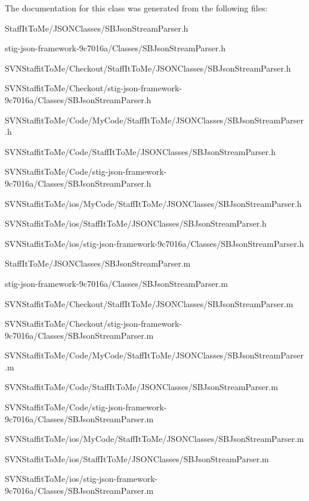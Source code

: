 \-The documentation for this class was generated from the following files\-:\begin{DoxyCompactItemize}
\item 
\-Staff\-It\-To\-Me/\-J\-S\-O\-N\-Classes/\-S\-B\-Json\-Stream\-Parser.\-h\item 
stig-\/json-\/framework-\/9c7016a/\-Classes/\-S\-B\-Json\-Stream\-Parser.\-h\item 
\-S\-V\-N\-Staffit\-To\-Me/\-Checkout/\-Staff\-It\-To\-Me/\-J\-S\-O\-N\-Classes/\-S\-B\-Json\-Stream\-Parser.\-h\item 
\-S\-V\-N\-Staffit\-To\-Me/\-Checkout/stig-\/json-\/framework-\/9c7016a/\-Classes/\-S\-B\-Json\-Stream\-Parser.\-h\item 
\-S\-V\-N\-Staffit\-To\-Me/\-Code/\-My\-Code/\-Staff\-It\-To\-Me/\-J\-S\-O\-N\-Classes/\-S\-B\-Json\-Stream\-Parser.\-h\item 
\-S\-V\-N\-Staffit\-To\-Me/\-Code/\-Staff\-It\-To\-Me/\-J\-S\-O\-N\-Classes/\-S\-B\-Json\-Stream\-Parser.\-h\item 
\-S\-V\-N\-Staffit\-To\-Me/\-Code/stig-\/json-\/framework-\/9c7016a/\-Classes/\-S\-B\-Json\-Stream\-Parser.\-h\item 
\-S\-V\-N\-Staffit\-To\-Me/ios/\-My\-Code/\-Staff\-It\-To\-Me/\-J\-S\-O\-N\-Classes/\-S\-B\-Json\-Stream\-Parser.\-h\item 
\-S\-V\-N\-Staffit\-To\-Me/ios/\-Staff\-It\-To\-Me/\-J\-S\-O\-N\-Classes/\-S\-B\-Json\-Stream\-Parser.\-h\item 
\-S\-V\-N\-Staffit\-To\-Me/ios/stig-\/json-\/framework-\/9c7016a/\-Classes/\-S\-B\-Json\-Stream\-Parser.\-h\item 
\-Staff\-It\-To\-Me/\-J\-S\-O\-N\-Classes/\-S\-B\-Json\-Stream\-Parser.\-m\item 
stig-\/json-\/framework-\/9c7016a/\-Classes/\-S\-B\-Json\-Stream\-Parser.\-m\item 
\-S\-V\-N\-Staffit\-To\-Me/\-Checkout/\-Staff\-It\-To\-Me/\-J\-S\-O\-N\-Classes/\-S\-B\-Json\-Stream\-Parser.\-m\item 
\-S\-V\-N\-Staffit\-To\-Me/\-Checkout/stig-\/json-\/framework-\/9c7016a/\-Classes/\-S\-B\-Json\-Stream\-Parser.\-m\item 
\-S\-V\-N\-Staffit\-To\-Me/\-Code/\-My\-Code/\-Staff\-It\-To\-Me/\-J\-S\-O\-N\-Classes/\-S\-B\-Json\-Stream\-Parser.\-m\item 
\-S\-V\-N\-Staffit\-To\-Me/\-Code/\-Staff\-It\-To\-Me/\-J\-S\-O\-N\-Classes/\-S\-B\-Json\-Stream\-Parser.\-m\item 
\-S\-V\-N\-Staffit\-To\-Me/\-Code/stig-\/json-\/framework-\/9c7016a/\-Classes/\-S\-B\-Json\-Stream\-Parser.\-m\item 
\-S\-V\-N\-Staffit\-To\-Me/ios/\-My\-Code/\-Staff\-It\-To\-Me/\-J\-S\-O\-N\-Classes/\-S\-B\-Json\-Stream\-Parser.\-m\item 
\-S\-V\-N\-Staffit\-To\-Me/ios/\-Staff\-It\-To\-Me/\-J\-S\-O\-N\-Classes/\-S\-B\-Json\-Stream\-Parser.\-m\item 
\-S\-V\-N\-Staffit\-To\-Me/ios/stig-\/json-\/framework-\/9c7016a/\-Classes/\-S\-B\-Json\-Stream\-Parser.\-m\end{DoxyCompactItemize}
